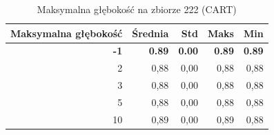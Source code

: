 \begin{table}[htbp]
\centering
\small
\setlength{\tabcolsep}{6pt}
\renewcommand{\arraystretch}{1.2}
\caption{Maksymalna głębokość na zbiorze 222 (CART)}
\label{tab:CART_max_depth_222}
\begin{tabular}{r|r|r|r|r}
\toprule
Maksymalna głębokość & Średnia & Std & Maks & Min \\
\hline
\textbf{-1} & \textbf{0.89} & \textbf{0.00} & \textbf{0.89} & \textbf{0.89} \\
2 & 0,88 & 0,00 & 0,88 & 0,88 \\
3 & 0,88 & 0,00 & 0,88 & 0,88 \\
5 & 0,88 & 0,00 & 0,88 & 0,88 \\
10 & 0,89 & 0,00 & 0,89 & 0,88 \\
\bottomrule
\end{tabular}
\end{table}